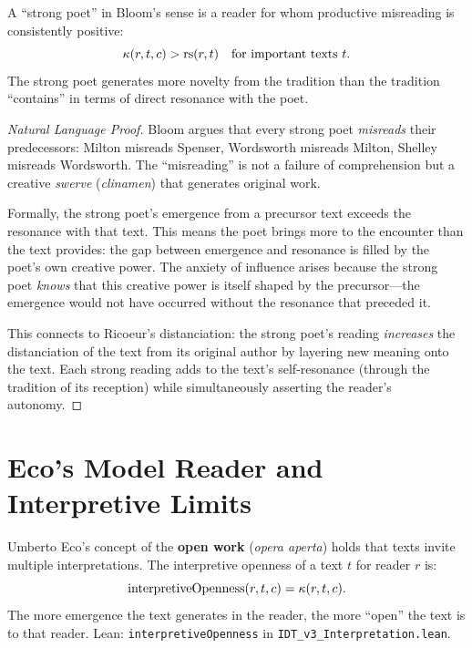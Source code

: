\begin{theorem}
\label{thm:bloom-strong-poet}
A ``strong poet'' in Bloom's sense is a reader for whom productive misreading
is consistently positive:
\[
\kappa(r, t, c) > \mathrm{rs}(r, t) \quad \text{for important texts } t.
\]
The strong poet generates more novelty from the tradition than the tradition
``contains'' in terms of direct resonance with the poet.
\end{theorem}

\begin{proof}[Natural Language Proof]
Bloom argues that every strong poet \emph{misreads} their predecessors: Milton
misreads Spenser, Wordsworth misreads Milton, Shelley misreads Wordsworth.
The ``misreading'' is not a failure of comprehension but a creative
\emph{swerve} (\textit{clinamen}) that generates original work.

Formally, the strong poet's emergence from a precursor text exceeds the
resonance with that text.  This means the poet brings more to the encounter
than the text provides: the gap between emergence and resonance is filled
by the poet's own creative power.  The anxiety of influence arises because
the strong poet \emph{knows} that this creative power is itself shaped by
the precursor---the emergence would not have occurred without the resonance
that preceded it.

This connects to Ricoeur's distanciation: the strong poet's reading
\emph{increases} the distanciation of the text from its original author
by layering new meaning onto the text.  Each strong reading adds to the
text's self-resonance (through the tradition of its reception) while
simultaneously asserting the reader's autonomy.
\end{proof}

\section{Eco's Model Reader and Interpretive Limits}

\begin{definition}
\label{def:interpretive-openness}
Umberto Eco's concept of the \textbf{open work} (\textit{opera aperta})
holds that texts invite multiple interpretations.  The interpretive openness
of a text $t$ for reader $r$ is:
\[
\mathrm{interpretiveOpenness}(r, t, c) = \kappa(r, t, c).
\]
The more emergence the text generates in the reader, the more ``open'' the
text is to that reader.
Lean: \texttt{interpretiveOpenness} in \texttt{IDT\_v3\_Interpretation.lean}.
\end{definition}

